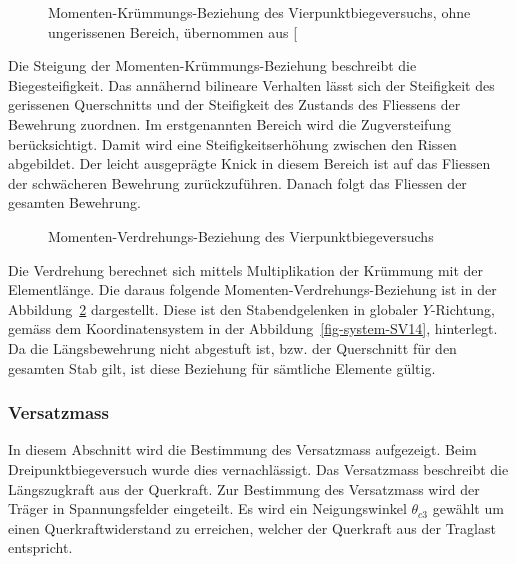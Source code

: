\documentclass[
  11pt,
  letterpaper,
]{scrreprt}
\begin{document}
\begin{figure}[H]


\caption{\label{fig-mchi_sv14}Momenten-Krümmungs-Beziehung des
Vierpunktbiegeversuchs, ohne ungerissenen Bereich, übernommen aus
{[}\citeproc{ref-gitz_ansatze_2024}{1}{]}}

\end{figure}%

Die Steigung der Momenten-Krümmungs-Beziehung beschreibt die
Biegesteifigkeit. Das annähernd bilineare Verhalten lässt sich der
Steifigkeit des gerissenen Querschnitts und der Steifigkeit des Zustands
des Fliessens der Bewehrung zuordnen. Im erstgenannten Bereich wird die
Zugversteifung berücksichtigt. Damit wird eine Steifigkeitserhöhung
zwischen den Rissen abgebildet. Der leicht ausgeprägte Knick in diesem
Bereich ist auf das Fliessen der schwächeren Bewehrung zurückzuführen.
Danach folgt das Fliessen der gesamten Bewehrung.

\begin{figure}[H]


\caption{\label{fig-mphi_sv14}Momenten-Verdrehungs-Beziehung des
Vierpunktbiegeversuchs}

\end{figure}%

Die Verdrehung berechnet sich mittels Multiplikation der Krümmung mit
der Elementlänge. Die daraus folgende Momenten-Verdrehungs-Beziehung ist
in der Abbildung~\ref{fig-mphi_sv14} dargestellt. Diese ist den
Stabendgelenken in globaler \(Y\)-Richtung, gemäss dem Koordinatensystem
in der Abbildung~\ref{fig-system-SV14}, hinterlegt. Da die
Längsbewehrung nicht abgestuft ist, bzw. der Querschnitt für den
gesamten Stab gilt, ist diese Beziehung für sämtliche Elemente gültig.

\subsubsection{Versatzmass}\label{versatzmass}

In diesem Abschnitt wird die Bestimmung des Versatzmass aufgezeigt. Beim
Dreipunktbiegeversuch wurde dies vernachlässigt. Das Versatzmass
beschreibt die Längszugkraft aus der Querkraft. Zur Bestimmung des
Versatzmass wird der Träger in Spannungsfelder eingeteilt. Es wird ein
Neigungswinkel \(\theta_{c3}\) gewählt um einen Querkraftwiderstand zu
erreichen, welcher der Querkraft aus der Traglast entspricht.
\end{document}
